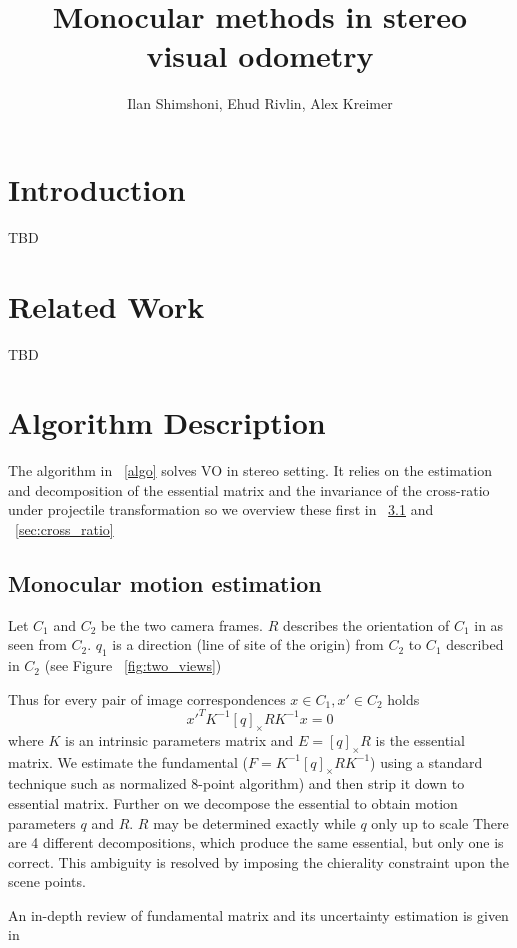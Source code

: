 \documentclass[10pt]{article}         %
\title{Monocular methods in stereo visual odometry}
\author{Ilan Shimshoni, Ehud Rivlin, Alex Kreimer}
\begin{document}
\maketitle


\section{Introduction}
TBD

\section{Related Work}
TBD

\section{Algorithm Description}

The algorithm in ~\ref{algo} solves VO in stereo setting. It relies on
the estimation and decomposition of the essential matrix and the
invariance of the cross-ratio under projectile transformation so we
overview these first in ~\ref{sec:mono_odo} and ~\ref{sec:cross_ratio}

\subsection{Monocular motion estimation}\label{sec:mono_odo}
Let $C_1$ and $C_2$ be the two camera frames.  $R$ describes the
orientation of $C_1$ in as seen from $C_2$. $q_1$ is a direction (line
of site of the origin) from $C_2$ to $C_1$ described in $C_2$ (see
Figure ~\ref{fig:two_views})

Thus for every pair of image correspondences $x\in C_1,x'\in C_2$ holds
\[
x'^TK^{-1}[q]_{\times}RK^{-1}x=0
\]
where $K$ is an intrinsic parameters matrix and $E=[q]_{\times}R$ is
the essential matrix.  We estimate the fundamental
($F=K^{-1}[q]_{\times}RK^{-1}$) using a standard technique such as
normalized 8-point algorithm) and then strip it down to essential
matrix.  Further on we decompose the essential to obtain motion
parameters $q$ and $R$.  $R$ may be determined exactly while $q$ only
up to scale There are 4 different decompositions, which produce the
same essential, but only one is correct.  This ambiguity is resolved
by imposing the chierality constraint upon the scene points.

An in-depth review of fundamental matrix and its uncertainty
estimation is given in ~\cite{zhang1998determining}
\end{document}
